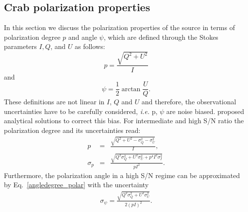 \documentclass[twocolumn,traditabstract]{aa}
\begin{document}



\subsection{Crab polarization properties}\label{sec:pol_properties}
In this section we discuss the polarization properties of the source in terms of polarization degree $p$ and angle $\psi$, which are defined through the Stokes parameters $I, Q$, and $U$ as follows:
\begin{equation}
 p    = \frac{\sqrt{Q^2 + U^2}}{I} \nonumber 
\end{equation}
and
 \begin{equation}
 \psi = \frac{1}{2}\arctan\frac{U}{Q}.\label{angledegree_polar}
 \end{equation}
These definitions are not linear in $I$, $Q$ and $U$ and therefore, the observational uncertainties have to be carefully considered, {\it i.e.} p, $\psi$ are noise biased. 
\citet{1980A&A....91...97S,1985A&A...142..100S,montier} proposed analytical solutions to correct this bias. For intermediate and high S/N ratio the polarization degree and its uncertainties read:
 \begin{eqnarray}
 p    &=& \frac{\sqrt{Q^2 + U^2 - \sigma_{Q}^2 - \sigma_{U}^2}}{I}, \nonumber \\ 
  \sigma_{p} &=& \frac{\sqrt{Q^2\sigma_Q^2 + U^2\sigma_U^2 + p^4I^2\sigma_I^2}}{pI^2}.
  \label{p_true_degree}
 \end{eqnarray}
 Furthermore, the polarization angle in a high S/N regime can be approximated by Eq.~\ref{angledegree_polar} with the uncertainty
  \begin{eqnarray}\label{angle_uncertainty}
  \sigma_{\psi} = \frac{\sqrt{Q^2\sigma_Q^2 + U^2\sigma_U^2}}{2(pI)^2}.
  \end{eqnarray}
\end{document}
